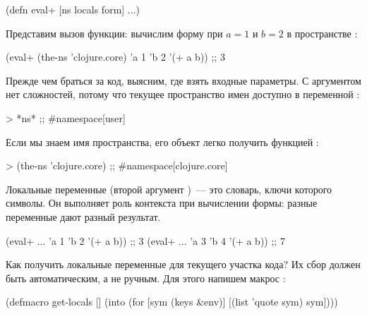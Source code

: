 \begin{english}
  \begin{clojure}
(defn eval+ [ns locals form]
  ...)
  \end{clojure}
\end{english}

Представим вызов функции: вычислим форму  при $a = 1$ и $b = 2$ в пространстве :

\begin{english}
  \begin{clojure}
(eval+ (the-ns 'clojure.core)
       {'a 1 'b 2}
       '(+ a b))
;; 3
  \end{clojure}
\end{english}

Прежде чем браться за код, выясним, где взять входные параметры. С аргументом  нет сложностей, потому что текущее пространство имен доступно в переменной :

\begin{english}
  \begin{clojure}
> *ns*
;; #namespace[user]
  \end{clojure}
\end{english}

Если мы знаем имя пространства, его объект легко получить функцией :

\begin{english}
  \begin{clojure}
> (the-ns 'clojure.core)
;; #namespace[clojure.core]
  \end{clojure}
\end{english}

Локальные переменные (второй аргумент )~--- это словарь, ключи которого символы. Он выполняет роль контекста при вычислении формы: разные переменные дают разный результат.

\begin{english}
  \begin{clojure}
(eval+ ... {'a 1 'b 2} '(+ a b)) ;; 3
(eval+ ... {'a 3 'b 4} '(+ a b)) ;; 7
  \end{clojure}
\end{english}

Как получить локальные переменные для текущего участка кода? Их сбор должен быть автоматическим, а не ручным. Для этого напишем макрос :

\begin{english}
  \begin{clojure/lines}
(defmacro get-locals []
  (into {} (for [sym (keys &env)]
             [(list 'quote sym) sym])))
  \end{clojure/lines}
\end{english}

